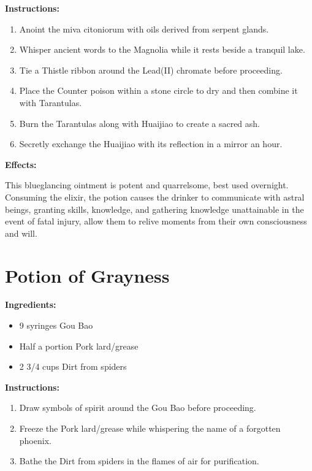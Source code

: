 \documentclass{article}
\begin{document}
\textbf{Instructions:}

\begin{enumerate}
  \item Anoint the miva citoniorum with oils derived from serpent glands.
  \item Whisper ancient words to the Magnolia while it rests beside a tranquil lake.
  \item Tie a Thistle ribbon around the Lead(II) chromate before proceeding.
  \item Place the Counter poison within a stone circle to dry and then combine it with Tarantulas.
  \item Burn the Tarantulas along with Huaijiao to create a sacred ash.
  \item Secretly exchange the Huaijiao with its reflection in a mirror an hour.
\end{enumerate}

\textbf{Effects:}

This blueglancing ointment is potent and quarrelsome, best used overnight. Consuming the elixir, the potion causes the drinker to communicate with astral beings, granting skills, knowledge, and gathering knowledge unattainable in the event of fatal injury, allow them to relive moments from their own consciousness and will.

\newpage
\section*{Potion of Grayness}

\textbf{Ingredients:}

\begin{itemize}
  \item 9 syringes Gou Bao
  \item Half a portion Pork lard/grease
  \item 2 3/4 cups Dirt from spiders
\end{itemize}

\textbf{Instructions:}

\begin{enumerate}
  \item Draw symbols of spirit around the Gou Bao before proceeding.
  \item Freeze the Pork lard/grease while whispering the name of a forgotten phoenix.
  \item Bathe the Dirt from spiders in the flames of air for purification.
\end{enumerate}
\end{document}
